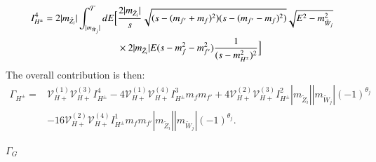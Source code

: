 \documentclass[final,3p,times]{elsarticle}
\begin{document}
\begin{equation} \label{IHpm4}
\begin{aligned}
I_{H^{\pm}}^{4} = 2|m_{\tilde{Z}_i}| \int_{|m_{\tilde{W}_{j}}|}^{\mathcal{T}} dE \Big[ &{2|m_{\tilde{Z}_i}| \over s} \sqrt{(s-(m_{f'}+m_{f})^2)(s-(m_{f'}-m_{f})^2)} \sqrt{E^2 - m_{\tilde{W}_j}^2} \\ & \times 2|m_{\tilde{Z}_i}|E (s-m_{f}^2 - m_{f'}^2){1 \over (s - m_{H^{\pm}}^2)^2}\Big]
\end{aligned}
\end{equation}
The overall contribution is then:
\begin{equation}
\begin{aligned}
\Gamma_{H^{\pm}} = & \mathcal{V}_{H+}^{(1)} \mathcal{V}_{H+}^{(3)} I_{H^{\pm}}^{4} - 4 \mathcal{V}_{H+}^{(1)} \mathcal{V}_{H+}^{(4)} I_{H^{\pm}}^3 m_{f}m_{f'} + 4 \mathcal{V}_{H+}^{(2)} \mathcal{V}_{H+}^{(3)} I_{H^{\pm}}^{2} |m_{\tilde{Z}_i}||m_{\tilde{W}_j}|(-1)^{\theta_j} \\ & - 16 \mathcal{V}_{H+}^{(2)} \mathcal{V}_{H+}^{(4)} I_{H^{\pm}}^{1} m_{f} m_{f'}|m_{\tilde{Z}_i}||m_{\tilde{W}_j}|(-1)^{\theta_j}.
\end{aligned}
\end{equation}

\textbf{\underline{$\Gamma_{G}$}}
\end{document}
